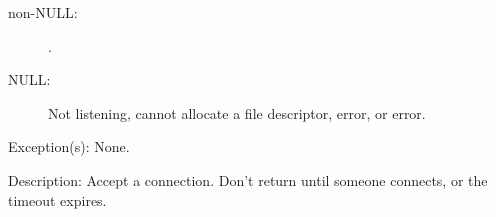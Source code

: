 \begin{capi}
\begin{capilist}
\begin{description}
\begin{description}
			\item[non-NULL: ]
				.
			\item[NULL: ]
				Not listening, cannot allocate a file
				descriptor,  error, or
				 error.
			\end{description}
		\end{description}
	\item[Exception(s): ] None.
	\item[Description: ]
		Accept a connection.  Don't return until someone connects, or
		the timeout expires.
	\end{capilist}
\end{capi}
